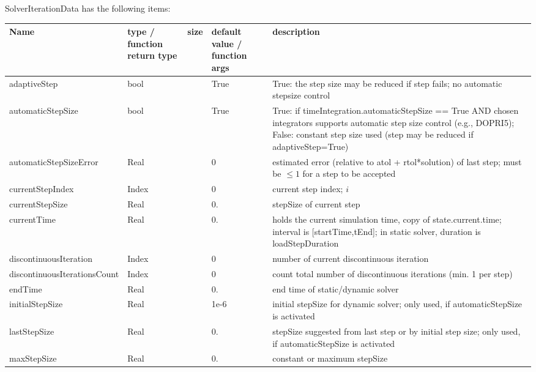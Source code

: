 \noindent SolverIterationData has the following items:
\begin{center}
  \footnotesize
  \begin{longtable}{| p{4.2cm} | p{2.5cm} | p{0.3cm} | p{3.0cm} | p{6cm} |}
    \hline
    \bf Name & \bf type / function return type & \bf size & \bf default value / function args & \bf description \\ \hline
    adaptiveStep &     bool &      &     True &     True: the step size may be reduced if step fails; no automatic stepsize control\\ \hline
    automaticStepSize &     bool &      &     True &     True: if timeIntegration.automaticStepSize == True AND chosen integrators supports automatic step size control (e.g., DOPRI5); False: constant step size used (step may be reduced if adaptiveStep=True)\\ \hline
    automaticStepSizeError &     Real &      &     0 &     estimated error (relative to atol + rtol*solution) of last step; must be $\le 1$  for a step to be accepted\\ \hline
    currentStepIndex &     Index &      &     0 &     current step index; $i$\\ \hline
    currentStepSize &     Real &      &     0. &     stepSize of current step\\ \hline
    currentTime &     Real &      &     0. &     holds the current simulation time, copy of state.current.time; interval is [startTime,tEnd]; in static solver, duration is loadStepDuration\\ \hline
    discontinuousIteration &     Index &      &     0 &     number of current discontinuous iteration\\ \hline
    discontinuousIterationsCount &     Index &      &     0 &     count total number of discontinuous iterations (min. 1 per step)\\ \hline
    endTime &     Real &      &     0. &     end time of static/dynamic solver\\ \hline
    initialStepSize &     Real &      &     1e-6 &     initial stepSize for dynamic solver; only used, if automaticStepSize is activated\\ \hline
    lastStepSize &     Real &      &     0. &     stepSize suggested from last step or by initial step size; only used, if automaticStepSize is activated\\ \hline
    maxStepSize &     Real &      &     0. &     constant or maximum stepSize\\ \hline

\end{longtable}
\end{center}

